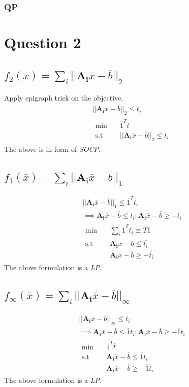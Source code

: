 \documentclass{article}
\begin{document}
\subsubsection*{QP}

\section*{\hfil Question 2}
\subsection*{$f_2(\overline{x}) = \sum_{i}||\mathbf{A_i}\overline{x} - \overline{b}||_2$}
Apply epigraph trick on the objective,
\begin{gather*}
	||\mathbf{A_i}\overline{x} - \overline{b}||_2 \le t_i\\
	\begin{aligned}
		\min \quad & \overline{1}^T\overline{t}\\
		\textrm{s.t} \quad & ||\mathbf{A_i}\overline{x} - \overline{b}||_2 \le t_i
	\end{aligned}
\end{gather*}
The above is in form of \textit{SOCP}.
\subsection*{$f_1(\overline{x}) = \sum_{i}||\mathbf{A_i}\overline{x} - \overline{b}||_1$}
\begin{gather*}
	||\mathbf{A_i}\overline{x} - \overline{b}||_1 \le \overline{1}^T\overline{t_i}\\
	\implies \mathbf{A_i}\overline{x} - \overline{b} \le \overline{t_i}; \mathbf{A_i}\overline{x} - \overline{b} \ge -\overline{t_i}\\
	\begin{aligned}
		\min \quad & \sum_{i}\overline{1}^T\overline{t_i} \equiv T\overline{1}\\
		\textrm{s.t} \quad & \mathbf{A_i}\overline{x} - \overline{b} \le \overline{t_i}\\
		& \mathbf{A_i}\overline{x} - \overline{b} \ge -\overline{t_i}
	\end{aligned}
\end{gather*}
The above formulation is a \textit{LP}.
\subsection*{$f_\infty(\overline{x}) = \sum_{i}||\mathbf{A_i}\overline{x} - \overline{b}||_\infty$}
\begin{gather*}
	||\mathbf{A_i}\overline{x} - \overline{b}||_\infty \le t_i\\
	\implies \mathbf{A_i}\overline{x} - \overline{b} \le \overline{1}t_i; \mathbf{A_i}\overline{x} - \overline{b} \ge -\overline{1}t_i\\
	\begin{aligned}
		\min \quad & \overline{1}^T\overline{t} \\
		\textrm{s.t} \quad & \mathbf{A_i}\overline{x} - \overline{b} \le \overline{1}t_i\\
		& \mathbf{A_i}\overline{x} - \overline{b} \ge -\overline{1}t_i
	\end{aligned}
\end{gather*}
The above formulation is a \textit{LP}.
\end{document}

